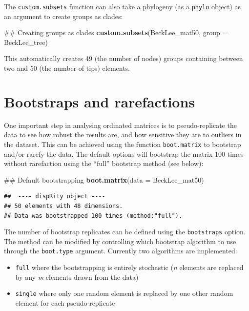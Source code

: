 \documentclass[]{book}
\newenvironment{Shaded}{\begin{snugshade}}{\end{snugshade}}
\newcommand{\KeywordTok}[1]{\textcolor[rgb]{0.13,0.29,0.53}{\textbf{#1}}}
\newcommand{\DataTypeTok}[1]{\textcolor[rgb]{0.13,0.29,0.53}{#1}}
\newcommand{\NormalTok}[1]{#1}
\providecommand{\tightlist}{%
  \setlength{\itemsep}{0pt}\setlength{\parskip}{0pt}}
\theoremstyle{definition}
\theoremstyle{definition}
\theoremstyle{definition}
\theoremstyle{remark}
\begin{document}
The \texttt{custom.subsets} function can also take a phylogeny (as a
\texttt{phylo} object) as an argument to create groups as clades:

\begin{Shaded}
\begin{Highlighting}[]
\NormalTok{## Creating groups as clades}
\KeywordTok{custom.subsets}\NormalTok{(BeckLee_mat50, }\DataTypeTok{group =}\NormalTok{ BeckLee_tree)}
\end{Highlighting}
\end{Shaded}

This automatically creates 49 (the number of nodes) groups containing
between two and 50 (the number of tips) elements.

\hypertarget{bootstraps-and-rarefactions}{\section{Bootstraps and
rarefactions}\label{bootstraps-and-rarefactions}}

One important step in analysing ordinated matrices is to
pseudo-replicate the data to see how robust the results are, and how
sensitive they are to outliers in the dataset. This can be achieved
using the function \texttt{boot.matrix} to bootstrap and/or rarefy the
data. The default options will bootstrap the matrix 100 times without
rarefaction using the ``full'' bootstrap method (see below):

\begin{Shaded}
\begin{Highlighting}[]
\NormalTok{## Default bootstrapping}
\KeywordTok{boot.matrix}\NormalTok{(}\DataTypeTok{data =}\NormalTok{ BeckLee_mat50)}
\end{Highlighting}
\end{Shaded}

\begin{verbatim}
##  ---- dispRity object ---- 
## 50 elements with 48 dimensions.
## Data was bootstrapped 100 times (method:"full").
\end{verbatim}

The number of bootstrap replicates can be defined using the
\texttt{bootstraps} option. The method can be modified by controlling
which bootstrap algorithm to use through the \texttt{boot.type}
argument. Currently two algorithms are implemented:

\begin{itemize}
\tightlist
\item
  \texttt{full} where the bootstrapping is entirely stochastic (\emph{n}
  elements are replaced by any \emph{m} elements drawn from the data)
\item
  \texttt{single} where only one random element is replaced by one other
  random element for each pseudo-replicate
\end{itemize}
\end{document}
